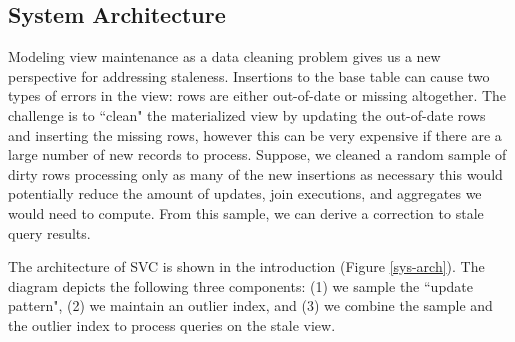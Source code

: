 








\subsection{System Architecture}
Modeling view maintenance as a data cleaning problem gives us a new perspective for addressing staleness.
Insertions to the base table can cause two types of errors in the view: rows are either out-of-date or missing altogether.
The challenge is to ``clean" the materialized view by updating the out-of-date rows and inserting the missing rows, however this can be very expensive if there are a large number of new records to process.
Suppose, we cleaned a random sample of dirty rows processing only as many of the new insertions as necessary this would potentially reduce the amount of updates, join executions, and aggregates we would need to compute.
From this sample, we can derive a correction to stale query results.

The architecture of SVC is shown in the introduction (Figure \ref{sys-arch}).
The diagram depicts the following three components: (1) we sample the ``update pattern",
(2) we maintain an outlier index, and (3) we combine the sample and the outlier index to process queries on the stale view.

